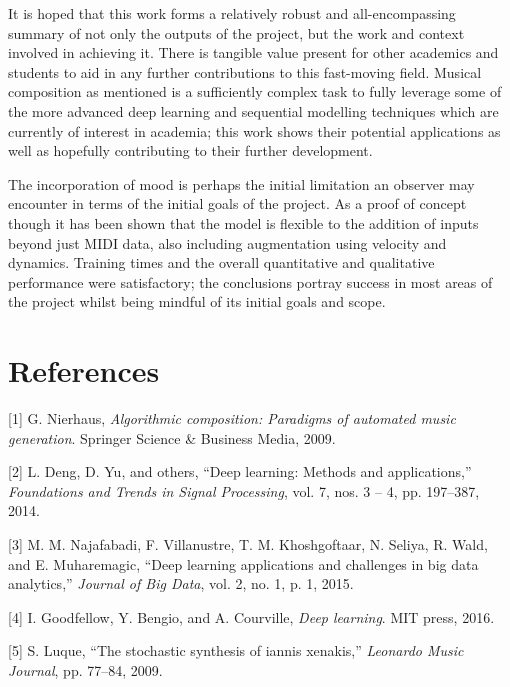 \documentclass[12pt,]{article}
\begin{document}
It is hoped that this work forms a relatively robust and
all-encompassing summary of not only the outputs of the project, but the
work and context involved in achieving it. There is tangible value
present for other academics and students to aid in any further
contributions to this fast-moving field. Musical composition as
mentioned is a sufficiently complex task to fully leverage some of the
more advanced deep learning and sequential modelling techniques which
are currently of interest in academia; this work shows their potential
applications as well as hopefully contributing to their further
development.

The incorporation of mood is perhaps the initial limitation an observer
may encounter in terms of the initial goals of the project. As a proof
of concept though it has been shown that the model is flexible to the
addition of inputs beyond just MIDI data, also including augmentation
using velocity and dynamics. Training times and the overall quantitative
and qualitative performance were satisfactory; the conclusions portray
success in most areas of the project whilst being mindful of its initial
goals and scope.

\hypertarget{references}{%
\section*{References}\label{references}}

\hypertarget{refs}{}
\leavevmode\hypertarget{ref-nierhaus2009algorithmic}{}%
{[}1{]} G. Nierhaus, \emph{Algorithmic composition: Paradigms of
automated music generation}. Springer Science \& Business Media, 2009.

\leavevmode\hypertarget{ref-deng2014deep}{}%
{[}2{]} L. Deng, D. Yu, and others, ``Deep learning: Methods and
applications,'' \emph{Foundations and Trends in Signal Processing}, vol.
7, nos. 3 -- 4, pp. 197--387, 2014.

\leavevmode\hypertarget{ref-najafabadi2015deep}{}%
{[}3{]} M. M. Najafabadi, F. Villanustre, T. M. Khoshgoftaar, N. Seliya,
R. Wald, and E. Muharemagic, ``Deep learning applications and challenges
in big data analytics,'' \emph{Journal of Big Data}, vol. 2, no. 1, p.
1, 2015.

\leavevmode\hypertarget{ref-goodfellow2016deep}{}%
{[}4{]} I. Goodfellow, Y. Bengio, and A. Courville, \emph{Deep
learning}. MIT press, 2016.

\leavevmode\hypertarget{ref-luque2009stochastic}{}%
{[}5{]} S. Luque, ``The stochastic synthesis of iannis xenakis,''
\emph{Leonardo Music Journal}, pp. 77--84, 2009.
\end{document}

